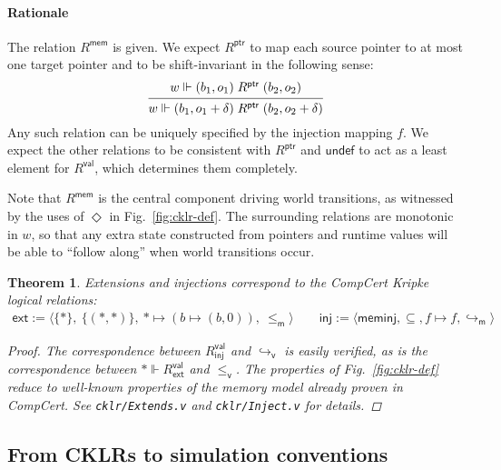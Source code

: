 \documentclass[draft,11pt]{report}
\newtheorem{theorem}{Theorem}[chapter]
\theoremstyle{definition}
\newcommand{\kw}[1]{\ensuremath{ \mathsf{#1} }}
\newcommand{\vref}{\le_\kw{v}}   %
\newcommand{\mext}{\le_\kw{m}}   %
\begin{document}
\paragraph{Rationale} %

The relation $R^\kw{mem}$ is given.
We expect $R^\kw{ptr}$ to map
each source pointer to at most one target pointer
and to be shift-invariant in the following sense:
\[
  \begin{prooftree}
    \hypo{w \Vdash (b_1, o_1) \mathrel{R^\kw{ptr}} (b_2, o_2)}
    \infer1{
      w \Vdash (b_1, o_1 + \delta) \mathrel{R^\kw{ptr}} (b_2, o_2 + \delta)}
  \end{prooftree}
\]
Any such relation can be uniquely specified by
the injection mapping $f$.
We expect the other relations to be consistent with $R^\kw{ptr}$
and $\kw{undef}$ to act as a least element for $R^\kw{val}$,
which determines them completely.


Note that $R^\kw{mem}$
is the central component driving world transitions,
as witnessed by the uses of $\Diamond$ in Fig.~\ref{fig:cklr-def}.
The surrounding relations are monotonic in $w$,
so that any extra state
constructed from pointers and runtime values
will be able to ``follow along'' when
world transitions occur.

\begin{theorem}
Extensions and injections
correspond to the CompCert Kripke logical relations:
\begin{align*}
  \kw{ext} :=
    \langle \{*\}, \: \{(*,*)\}, \: * \mapsto (b \mapsto (b, 0)), \:
    {\mext} \rangle
  \qquad
  \kw{inj} :=
    \langle \kw{meminj}, {\subseteq}, f \mapsto f,
      {\hookrightarrow_\kw{m}} \rangle
\end{align*}
\begin{proof}
The correspondence between $R^\kw{val}_\kw{inj}$ and
$\hookrightarrow_\kw{v}$ is easily verified,
as is the correspondence between
$* \Vdash R^\kw{val}_\kw{ext}$ and $\vref$.
The properties of Fig.~\ref{fig:cklr-def}
reduce to well-known properties of the memory model
already proven in CompCert.
See \texttt{cklr/Extends.v} and \texttt{cklr/Inject.v}
for details.
\end{proof}
\end{theorem}


\subsection{From CKLRs to simulation conventions} \label{sec:cklrsc} %
\end{document}
